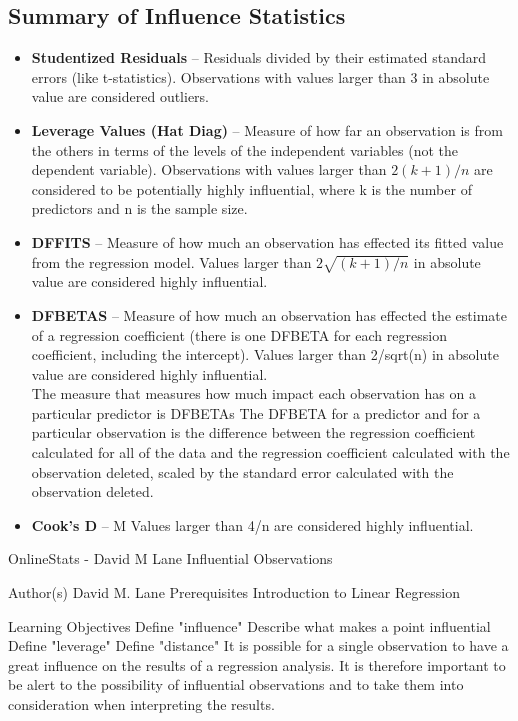 \subsection{Summary of Influence Statistics}
\begin{itemize}
	\item	\textbf{Studentized Residuals} – Residuals divided by their estimated standard errors (like t-statistics). Observations with values larger than 3 in absolute value are considered outliers.
	\item	\textbf{Leverage Values (Hat Diag)} – Measure of how far an observation is from the others in terms of the levels of the independent variables (not the dependent variable). Observations with values larger than $2(k+1)/n$ are considered to be potentially highly influential, where k is the number of predictors and n is the sample size.
	\item	\textbf{DFFITS} – Measure of how much an observation has effected its fitted value from the regression model. Values larger than $2\sqrt{(k+1)/n}$ in absolute value are considered highly influential. %
	\item	\textbf{DFBETAS} – Measure of how much an observation has effected the estimate of a regression coefficient (there is one DFBETA for each regression coefficient, including the intercept). Values larger than 2/sqrt(n) in absolute value are considered highly influential.
	\\
	The measure that measures how much impact each observation has on a particular predictor is DFBETAs The DFBETA for a predictor and for a particular observation is the difference between the regression coefficient calculated for all of the data and the regression coefficient calculated with the observation deleted, scaled by the standard error calculated with the observation deleted. 
	
	\item	\textbf{Cook’s D} – M Values larger than 4/n are considered highly influential.
\end{itemize}
\newpage

OnlineStats - David M Lane
Influential Observations

Author(s)
David M. Lane
Prerequisites
Introduction to Linear Regression

Learning Objectives
Define "influence"
Describe what makes a point influential
Define "leverage"
Define "distance"
It is possible for a single observation to have a great influence on the results of a regression analysis. It is therefore important to be alert to the possibility of influential observations and to take them into consideration when interpreting the results.
